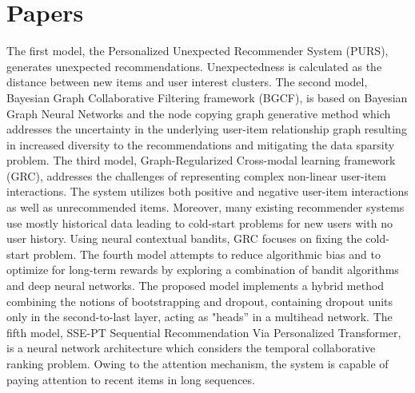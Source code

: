 \section{Papers}
The first model, the Personalized Unexpected Recommender System (PURS), generates unexpected recommendations.  Unexpectedness is calculated as the distance between new items and user interest clusters. The second model, Bayesian Graph Collaborative Filtering framework (BGCF), is based on Bayesian Graph Neural Networks and the node copying graph generative method which addresses the uncertainty in the underlying user-item relationship graph resulting in increased diversity to the recommendations and mitigating the data sparsity problem. The third model, Graph-Regularized Cross-modal learning framework (GRC), addresses the challenges of representing complex non-linear user-item interactions. The system utilizes both positive and negative user-item interactions as well as unrecommended items. Moreover, many existing recommender systems use mostly historical data leading to cold-start problems for new users with no user history. Using neural contextual bandits, GRC focuses on fixing the cold-start problem. The fourth model attempts to reduce algorithmic bias and to optimize for long-term rewards by exploring a combination of bandit algorithms and deep neural networks. The proposed model implements a hybrid method combining the notions of bootstrapping and dropout, containing dropout units only in the second-to-last layer, acting as "heads” in a multihead network.
The fifth model, SSE-PT Sequential Recommendation Via Personalized Transformer, is a neural network architecture which considers the temporal collaborative ranking problem. Owing to the attention mechanism, the system is capable of paying attention to recent items in long sequences.

